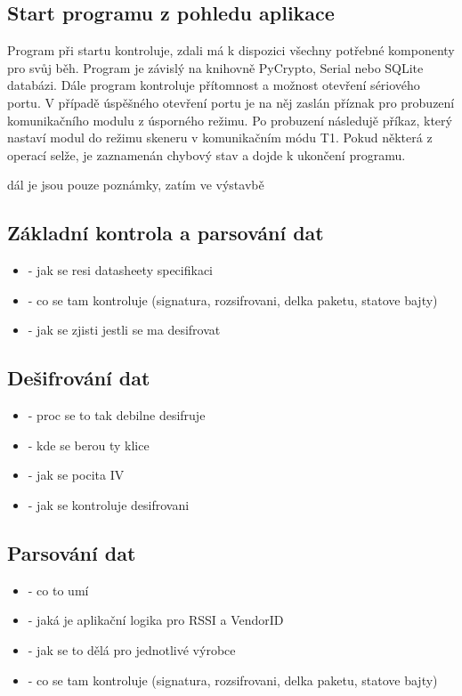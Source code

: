\subsection{Start programu z pohledu aplikace}
Program při startu kontroluje, zdali  má k dispozici všechny potřebné komponenty pro svůj běh. Program je závislý na knihovně PyCrypto, Serial nebo SQLite databázi.
Dále program kontroluje přítomnost a možnost otevření sériového portu. V případě úspěšného otevření portu je na něj zaslán příznak pro probuzení komunikačního modulu z úsporného režimu. Po probuzení následujě příkaz, který nastaví modul do režimu skeneru v komunikačním módu T1. Pokud některá z operací selže, je zaznamenán chybový stav a dojde k ukončení programu.

\colorbox[rgb]{0,1,0}{dál je jsou pouze poznámky, zatím ve výstavbě}

\subsection{Základní kontrola a parsování dat}
\begin{itemize}
\item - jak se resi datasheety specifikaci
\item - co se tam kontroluje (signatura, rozsifrovani, delka paketu, statove bajty)
\item - jak se zjisti jestli se ma desifrovat
\end{itemize}

\subsection{Dešifrování dat}
\begin{itemize}
\item - proc se to tak debilne desifruje
\item - kde se berou ty klice
\item - jak se pocita IV
\item - jak se kontroluje desifrovani
\end{itemize}

\subsection{Parsování dat}
\begin{itemize}
\item - co to umí
\item - jaká je aplikační logika pro RSSI a VendorID
\item - jak se to dělá pro jednotlivé výrobce
\item - co se tam kontroluje (signatura, rozsifrovani, delka paketu, statove bajty)
\end{itemize}

